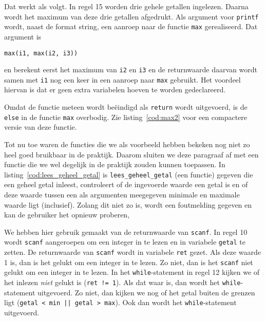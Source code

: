
Dat werkt als volgt. In regel 15 worden drie gehele getallen ingelezen. Daarna wordt het maximum van deze drie getallen afgedrukt. Als argument voor \texttt{printf} wordt, naast de format string, een aanroep naar de functie \texttt{max} gerealiseerd. Dat argument is

\hspace*{1em}\texttt{max(i1, max(i2, i3))}

en berekent eerst het maximum van \texttt{i2} en \texttt{i3} en de returnwaarde daarvan wordt samen met \texttt{i1} nog een keer in een aanroep naar \texttt{max} gebruikt. Het voordeel hiervan is dat er geen extra variabelen hoeven te worden gedeclareerd.

Omdat de functie meteen wordt beëindigd als \texttt{return} wordt uitgevoerd, is de \texttt{else} in de functie \texttt{max} overbodig. Zie listing~\ref{cod:max2} voor een compactere versie van deze functie.


Tot nu toe waren de functies die we als voorbeeld hebben bekeken nog niet zo heel goed bruikbaar in de praktijk.
Daarom sluiten we deze paragraaf af met een functie die we wel degelijk in de praktijk zouden kunnen toepassen.
In listing~\ref{cod:lees_geheel_getal} is \texttt{lees\_geheel\_getal} (een functie) gegeven die een geheel getal inleest, controleert of de ingevoerde waarde een getal is en of deze waarde tussen een als argumenten meegegeven minimale en maximale waarde ligt (inclusief).
Zolang dit niet zo is, wordt een foutmelding gegeven en kan de gebruiker het opnieuw proberen,


We hebben hier gebruik gemaakt van de returnwaarde van \texttt{scanf}. In regel 10 wordt \texttt{scanf} aangeroepen om een integer in te lezen en in variabele \texttt{getal} te zetten. De returnwaarde van \texttt{scanf} wordt in variabele \texttt{ret} gezet. Als deze waarde 1 is, dan is het gelukt om een integer in te lezen. Zo niet, dan is het  \texttt{scanf} niet gelukt om een integer in te lezen. In het \texttt{while}-statement in regel 12 kijken we of het inlezen \textsl{niet} gelukt is (\texttt{ret != 1}). Als dat waar is, dan wordt het \texttt{while}-statement uitgevoerd. Zo niet, dan kijken we nog of het getal buiten de grenzen ligt (\texttt{getal < min || getal > max}). Ook dan wordt het \texttt{while}-statement uitgevoerd.

